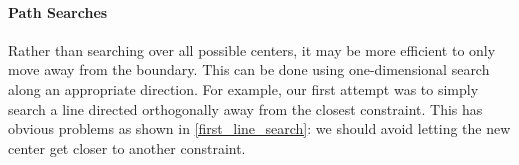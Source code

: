 \paragraph{Path Searches}

% 
% 
% 
% 
% 

Rather than searching over all possible centers, it may be more efficient to only move away from the boundary.
This can be done using one-dimensional search along an appropriate direction.
For example, our first attempt was to simply search a line directed orthogonally away from the closest constraint.
This has obvious problems as shown in \cref{first_line_search}: we should avoid letting the new center get closer to another constraint.    


